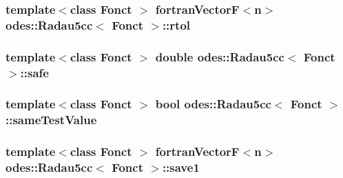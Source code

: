 \subsubsection[{rtol}]{\setlength{\rightskip}{0pt plus 5cm}template$<$class Fonct $>$ {\bf fortran\+Vector\+F}$<${\bf n}$>$ {\bf odes\+::\+Radau5cc}$<$ Fonct $>$\+::rtol\hspace{0.3cm}{\ttfamily [private]}}\label{classodes_1_1Radau5cc_a6fb4ed14d3b1141a927cbbaf3f3f5536}
\hypertarget{classodes_1_1Radau5cc_a8809fb6e400f5eaa32331a2e463f9cdb}{}
\subsubsection[{safe}]{\setlength{\rightskip}{0pt plus 5cm}template$<$class Fonct $>$ double {\bf odes\+::\+Radau5cc}$<$ Fonct $>$\+::safe\hspace{0.3cm}{\ttfamily [private]}}\label{classodes_1_1Radau5cc_a8809fb6e400f5eaa32331a2e463f9cdb}
\hypertarget{classodes_1_1Radau5cc_acab8ee5b4ea97c71a0f34bf41f145a58}{}
\subsubsection[{same\+Test\+Value}]{\setlength{\rightskip}{0pt plus 5cm}template$<$class Fonct $>$ bool {\bf odes\+::\+Radau5cc}$<$ Fonct $>$\+::same\+Test\+Value\hspace{0.3cm}{\ttfamily [private]}}\label{classodes_1_1Radau5cc_acab8ee5b4ea97c71a0f34bf41f145a58}
\hypertarget{classodes_1_1Radau5cc_a2d4840f821ba5e059d73ca63a002aca1}{}
\subsubsection[{save1}]{\setlength{\rightskip}{0pt plus 5cm}template$<$class Fonct $>$ {\bf fortran\+Vector\+F}$<${\bf n}$>$ {\bf odes\+::\+Radau5cc}$<$ Fonct $>$\+::save1\hspace{0.3cm}{\ttfamily [private]}}\label{classodes_1_1Radau5cc_a2d4840f821ba5e059d73ca63a002aca1}
\hypertarget{classodes_1_1Radau5cc_a8928e81eefe11977cd13856b65048dac}{}
